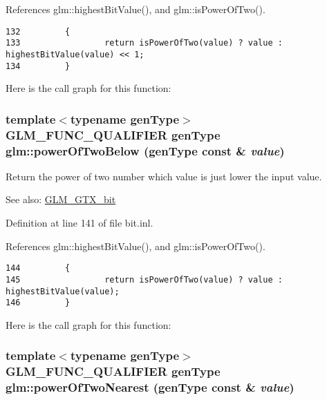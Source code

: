 References glm::highestBitValue(), and glm::isPowerOfTwo().

\begin{Code}\begin{verbatim}132         {
133                 return isPowerOfTwo(value) ? value : highestBitValue(value) << 1;
134         }
\end{verbatim}
\end{Code}




Here is the call graph for this function:\hypertarget{group__gtx__bit_ga0bb1687b43f594a471c5506cc505dce}{
\subsubsection[powerOfTwoBelow]{\setlength{\rightskip}{0pt plus 5cm}template$<$typename genType$>$ GLM\_\-FUNC\_\-QUALIFIER genType glm::powerOfTwoBelow (genType const \& {\em value})}}
\label{group__gtx__bit_ga0bb1687b43f594a471c5506cc505dce}


Return the power of two number which value is just lower the input value. \begin{Desc}
\item[See also:]\hyperlink{group__gtx__bit}{GLM\_\-GTX\_\-bit} \end{Desc}


Definition at line 141 of file bit.inl.

References glm::highestBitValue(), and glm::isPowerOfTwo().

\begin{Code}\begin{verbatim}144         {
145                 return isPowerOfTwo(value) ? value : highestBitValue(value);
146         }
\end{verbatim}
\end{Code}




Here is the call graph for this function:\hypertarget{group__gtx__bit_g0e3c8f921e59dc07ad9c70bb1376799c}{
\subsubsection[powerOfTwoNearest]{\setlength{\rightskip}{0pt plus 5cm}template$<$typename genType$>$ GLM\_\-FUNC\_\-QUALIFIER genType glm::powerOfTwoNearest (genType const \& {\em value})}}
\label{group__gtx__bit_g0e3c8f921e59dc07ad9c70bb1376799c}


